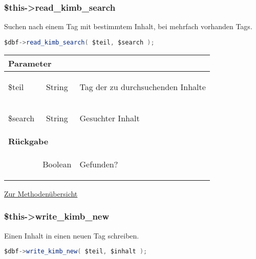 \documentclass[paper=A4,pagesize=auto,12pt,headinclude=true,footinclude=true,BCOR=0mm,DIV=calc]{scrartcl}
\begin{document}
  \subsubsection{\$this->read\_kimb\_search}
  \label{sec:mth_search}
	   Suchen nach einem Tag mit bestimmtem Inhalt, bei mehrfach vorhanden Tags.
	    \begin{lstlisting}[gobble=4,language=Java]
	      $dbf->read_kimb_search( $teil, $search );
	    \end{lstlisting}
	    
	    \begin{tabular}{|lcp{}|}
		    \hline
		      \multicolumn{3}{|l|}{ \textbf{Parameter} } \\
		    \hline
		      \$teil & String & \begin{itshape} Tag der zu durchsuchenden Inhalte \end{itshape} \\
		      \$search & String & \begin{itshape} Gesuchter Inhalt \end{itshape} \\
		    \hline
		      \multicolumn{3}{|l|}{ \textbf{Rückgabe} } \\
		    \hline
			     & Boolean & \begin{itshape} Gefunden? \end{itshape} \\
		    \hline
	    \end{tabular}
	    \begin{flushright} \small \hyperref[tab:methodenuerbersicht]{Zur Methodenübersicht} \end{flushright}
  
  \subsubsection{\$this->write\_kimb\_new}
  \label{sec:mth_new}
	    Einen Inhalt in einen neuen Tag schreiben.
	    \begin{lstlisting}[gobble=4,language=Java]
	      $dbf->write_kimb_new( $teil, $inhalt );
	    \end{lstlisting}
	    
\end{document}
